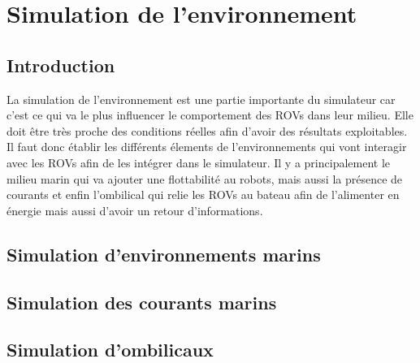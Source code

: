 \chapter{Simulation de l'environnement}
	
	\section{Introduction}

		La simulation de l'environnement est une partie importante du simulateur car c'est ce qui va le plus influencer le comportement des \gls{ROV}s dans leur milieu. Elle doit être très proche des conditions réelles afin d'avoir des résultats exploitables. Il faut donc établir les différents élements de l'environnements qui vont interagir avec les \gls{ROV}s afin de les intégrer dans le simulateur. Il y a principalement le milieu marin qui va ajouter une flottabilité au robots, mais aussi la présence de courants et enfin l'ombilical qui relie les \gls{ROV}s au bateau afin de l'alimenter en énergie mais aussi d'avoir un retour d'informations.

	\section{Simulation d'environnements marins}

	\section{Simulation des courants marins}

	\section{Simulation d'ombilicaux}

		
	